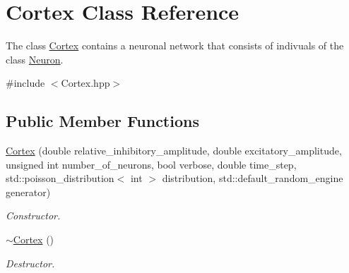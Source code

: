 \hypertarget{class_cortex}{}\section{Cortex Class Reference}
\label{class_cortex}


The class \hyperlink{class_cortex}{Cortex} contains a neuronal network that consists of indivuals of the class \hyperlink{class_neuron}{Neuron}.  




{\ttfamily \#include $<$Cortex.\+hpp$>$}

\subsection*{Public Member Functions}
\begin{DoxyCompactItemize}
\item 
\hyperlink{class_cortex_a1a58ad159553ce6da6fff6daa400f296}{Cortex} (double relative\+\_\+inhibitory\+\_\+amplitude, double excitatory\+\_\+amplitude, unsigned int number\+\_\+of\+\_\+neurons, bool verbose, double time\+\_\+step, std\+::poisson\+\_\+distribution$<$ int $>$ distribution, std\+::default\+\_\+random\+\_\+engine generator)
\begin{DoxyCompactList}\small\item\em Constructor. \end{DoxyCompactList}\item 
\hypertarget{class_cortex_a97611a2e9486cac2b13d48579db546f8}{}\label{class_cortex_a97611a2e9486cac2b13d48579db546f8} 
\hyperlink{class_cortex_a97611a2e9486cac2b13d48579db546f8}{$\sim$\+Cortex} ()
\begin{DoxyCompactList}\small\item\em Destructor. \end{DoxyCompactList}\end{DoxyCompactItemize}
